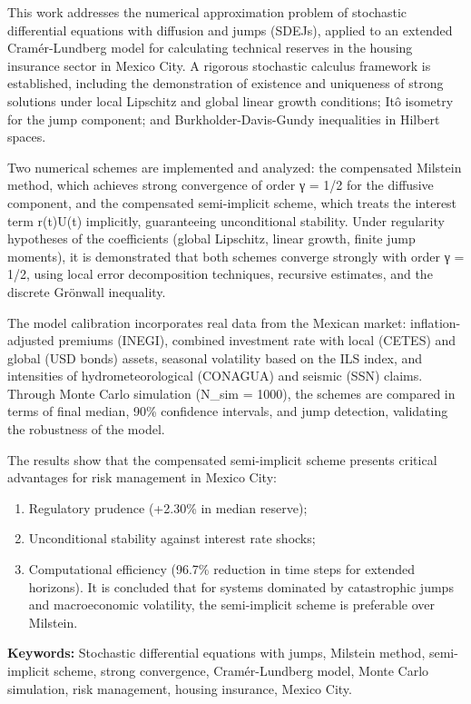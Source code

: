 This work addresses the numerical approximation problem of stochastic
differential equations with diffusion and jumps (SDEJs), applied to an
extended Cramér-Lundberg model for calculating technical reserves in the
housing insurance sector in Mexico City. A rigorous stochastic calculus
framework is established, including the demonstration of existence and
uniqueness of strong solutions under local Lipschitz and global linear
growth conditions; Itô isometry for the jump component; and
Burkholder-Davis-Gundy inequalities in Hilbert spaces.

Two numerical schemes are implemented and analyzed: the compensated
Milstein method, which achieves strong convergence of order γ = 1/2 for
the diffusive component, and the compensated semi-implicit scheme, which
treats the interest term r(t)U(t) implicitly, guaranteeing unconditional
stability. Under regularity hypotheses of the coefficients (global
Lipschitz, linear growth, finite jump moments), it is demonstrated that
both schemes converge strongly with order γ = 1/2, using local error
decomposition techniques, recursive estimates, and the discrete Grönwall
inequality.

The model calibration incorporates real data from the Mexican market:
inflation-adjusted premiums (INEGI), combined investment rate with local
(CETES) and global (USD bonds) assets, seasonal volatility based on the
ILS index, and intensities of hydrometeorological (CONAGUA) and seismic
(SSN) claims. Through Monte Carlo simulation (N\_sim = 1000), the
schemes are compared in terms of final median, 90\% confidence
intervals, and jump detection, validating the robustness of the model.

The results show that the compensated semi-implicit scheme presents
critical advantages for risk management in Mexico City:

\begin{enumerate}
\def\labelenumi{\roman{enumi}.}
\item
  Regulatory prudence (+2.30\% in median reserve);
\item
  Unconditional stability against interest rate shocks;
\item
  Computational efficiency (96.7\% reduction in time steps for extended
  horizons). It is concluded that for systems dominated by catastrophic
  jumps and macroeconomic volatility, the semi-implicit scheme is
  preferable over Milstein.
\end{enumerate}

\textbf{Keywords:} Stochastic differential equations with jumps,
Milstein method, semi-implicit scheme, strong convergence,
Cramér-Lundberg model, Monte Carlo simulation, risk management, housing
insurance, Mexico City.